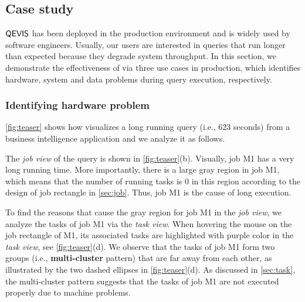 \subsection{Case study} \label{sec:case}

${\sf QEVIS}{}$ has been deployed in the production environment and is widely used by software engineers.
Usually, our users are interested in queries that run longer than expected because they degrade system throughput. 
In this section, we demonstrate the effectiveness of \qevis{} via three use cases  in production, which identifies hardware, system and data problems during query execution, respectively.


\subsubsection{Identifying hardware problem} \label{sec:systemproblem}
\autoref{fig:teaser} shows how \qevis{} visualizes a long running query (i.e., 623 seconds) from a business intelligence application and we analyze it as follows.

The \textit{job view} of the query is shown in \autoref{fig:teaser}(b).
Visually, job M1 has a very long running time.
More importantly, there is a large gray region in job M1, which means that the number of running tasks is 0 in this region according to the design of job rectangle in \autoref{sec:job}.
Thus, job M1 is the cause of long execution.


To find the reasons that cause the gray region for job M1 in the \textit{job view}, we analyze the tasks of job M1 via the \textit{task view}.
When hovering the mouse on the job rectangle of M1, its associated tasks are highlighted with purple color in the \textit{task view}, see \autoref{fig:teaser}(d). 
We observe that the tasks of job M1 form two groups (i.e., \textbf{multi-cluster} pattern) that are far away from each other, as illustrated by the two dashed ellipses in \autoref{fig:teaser}(d). 
As discussed in \autoref{sec:task}, the multi-cluster pattern suggests that the tasks of job M1 are not executed properly due to machine problems.

